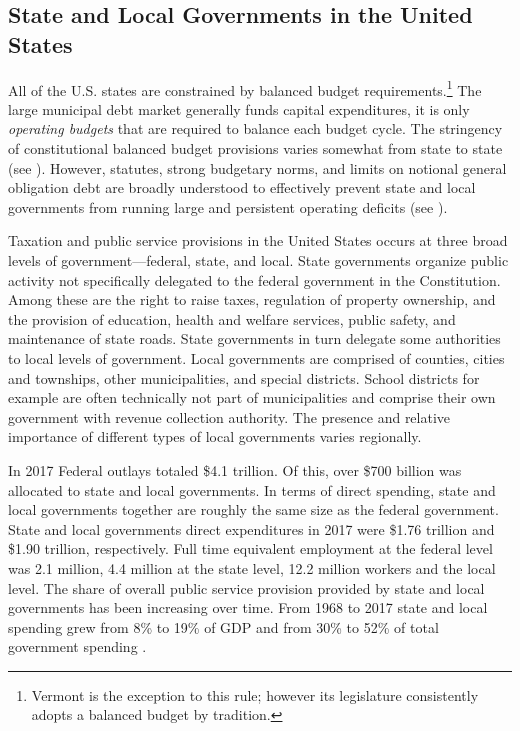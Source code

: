 


\subsection{State and Local Governments in the United States}
\label{section:motivation}

All of the U.S. states are constrained by balanced budget requirements.\footnote{Vermont is the exception to this rule; however its legislature consistently adopts a balanced budget by tradition.} The large municipal debt market generally funds capital expenditures, it is only \emph{operating budgets} that are required to balance each budget cycle. The stringency of constitutional balanced budget provisions varies somewhat from state to state (see \cite{HouSmith:2010:BBR}). However, statutes, strong budgetary norms, and limits on notional general obligation debt are broadly understood to effectively prevent state and local governments from running large and persistent operating deficits (see \cite{NCSL:2010:BalancedBudget}).

Taxation and public service provisions in the United States occurs at three broad levels of government---federal, state, and local. State governments organize public activity not specifically delegated to the federal government in the Constitution. Among these are the right to raise taxes, regulation of property ownership, and the provision of education, health and welfare services, public safety, and maintenance of state roads. State governments in turn delegate some authorities to local levels of government. Local governments are comprised of counties, cities and townships, other municipalities, and special districts. School districts for example are often technically not part of municipalities and comprise their own government with revenue collection authority. The presence and relative importance of different types of local governments varies regionally. 

In 2017 Federal outlays totaled \$4.1 trillion. 
Of this, over \$700 billion was allocated to state and local governments. 
In terms of direct spending, state and local governments together are roughly the same size as the federal government. 
State and local governments direct expenditures in 2017 were \$1.76 trillion and \$1.90 trillion, respectively. 
Full time equivalent employment at the federal level was 2.1 million, 4.4 million at the state level, 12.2 million workers and the local level. The share of overall public service provision provided by state and local governments has been increasing over time. From 1968 to 2017 state and local spending grew from 8\% to 19\% of GDP and from 30\% to 52\% of total government spending \citep{Baicker_al:2012:RiseStates}.

